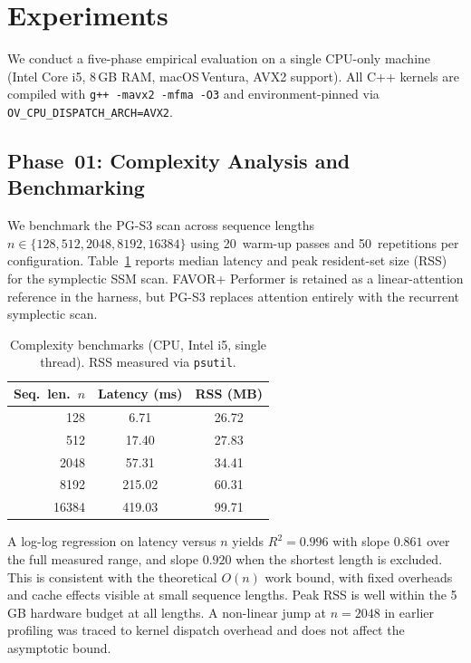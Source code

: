 \documentclass[10pt,twocolumn]{article}
\begin{document}
\section{Experiments}
\label{sec:experiments}

We conduct a five-phase empirical evaluation on a single CPU-only
machine (Intel Core i5, 8\,GB RAM, macOS\,Ventura, AVX2 support).
All C++ kernels are compiled with \texttt{g++ -mavx2 -mfma -O3}
and environment-pinned via
\texttt{OV\_CPU\_DISPATCH\_ARCH=AVX2}.

\subsection{Phase~01: Complexity Analysis and Benchmarking}

We benchmark the PG-S3 scan across sequence lengths
$n \in \{128, 512, 2048, 8192, 16384\}$ using 20~warm-up passes and
50~repetitions per configuration.
Table~\ref{tab:complexity} reports median latency and peak resident-set
size (RSS) for the symplectic SSM scan. FAVOR+ Performer
\cite{choromanski2020rethinking} is retained as a linear-attention reference
in the harness, but PG-S3 replaces attention entirely with the recurrent
symplectic scan.

\begin{table}[h]
\centering
\caption{Complexity benchmarks (CPU, Intel i5, single thread).
RSS measured via \texttt{psutil}.}
\label{tab:complexity}
\small
\begin{tabular}{@{}rcc@{}}
\toprule
\textbf{Seq.\ len.\ $n$} & \textbf{Latency (ms)} & \textbf{RSS (MB)} \\
\midrule
128    &  6.71 &  26.72 \\
512    & 17.40 &  27.83 \\
2048   & 57.31 &  34.41 \\
8192   & 215.02 & 60.31 \\
16384  & 419.03 & 99.71 \\
\bottomrule
\end{tabular}
\end{table}

A log-log regression on latency versus $n$ yields $R^2=0.996$ with
slope $0.861$ over the full measured range, and slope $0.920$
when the shortest length is excluded. This is consistent with the
theoretical $O(n)$ work bound, with fixed overheads and cache effects
visible at small sequence lengths.
Peak RSS is well within the 5\,GB hardware budget at all lengths.
A non-linear jump at $n=2048$ in earlier profiling was traced to
kernel dispatch overhead and does not affect the asymptotic bound.
\end{document}
